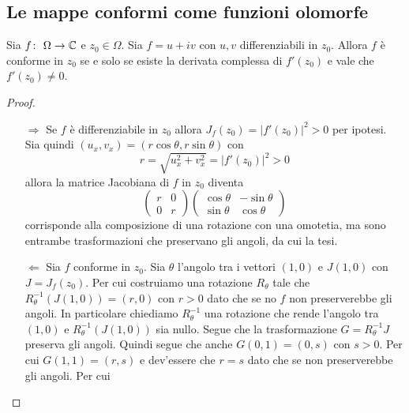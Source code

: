 \subsection{\textcolor{AnComp}{\textbf{Le mappe conformi come funzioni olomorfe}}}
\begin{theorem}
 \label{thr:conferme_sse_jacobiana_non_nulla}
  Sia $f \colon\ \Omega \rightarrow \mathbb{C}$ e $z_0 \in \Omega$. Sia $f = u + iv$ con $u,v$
  differenziabili in $z_0$. Allora $f$ è conforme in $z_0$ se e solo se esiste
  la derivata complessa di $f'(z_0)$ e vale che $f'(z_0) \neq 0$.
\end{theorem}
\begin{proof}\
  \begin{enumerate}
    \item[$\Rightarrow$] Se $f$ è differenziabile in $z_0$ allora $J_f(z_0) = 
      |f'(z_0)|^2 > 0$ per ipotesi. Sia quindi $(u_x,v_x) = (r\cos\theta, 
      r\sin\theta)$ con 
      \begin{equation*}
        r = \sqrt{u_x^2 + v_x^2} = |f'(z_0)|^2 > 0 
      \end{equation*}
      allora la matrice Jacobiana di $f$ in $z_0$ diventa
      \begin{equation*}
        \left(\begin{array}{cc}
          r & 0 \\
          0 & r
      \end{array}\right)
       \left( \begin{array}{cc}
          \cos\theta & - \sin \theta \\
          \sin \theta & \cos \theta
      \end{array}\right)
      \end{equation*}
      corrisponde alla composizione di una rotazione con una omotetia, ma sono
      entrambe trasformazioni che preservano gli angoli, da cui la tesi.
    \item[$\Leftarrow$] Sia $f$ conforme in $z_0$. Sia $\theta$ l'angolo tra
      i vettori $(1,0)$ e $J(1,0)$ con $J = J_f(z_0)$. Per cui costruiamo una
      rotazione $R_\theta$ tale che $R_\theta^{-1}(J(1,0)) = (r,0)$ con $r > 0$
      dato che se no $f$ non preserverebbe gli angoli. In particolare chiediamo
      $R^{-1}_\theta$ una rotazione che rende l'angolo tra $(1,0)$
      e $R^{-1}_\theta(J(1,0))$ sia nullo. Segue che la
      trasformazione $G = R^{-1}_\theta J$ preserva gli angoli. Quindi segue che
      anche $G (0,1) = (0, s)$ con $s > 0$.  Per cui $G(1,1) = (r,s)$
      e dev'essere che $r = s$ dato che se non preserverebbe gli angoli. Per cui

\end{enumerate}
\end{proof}
